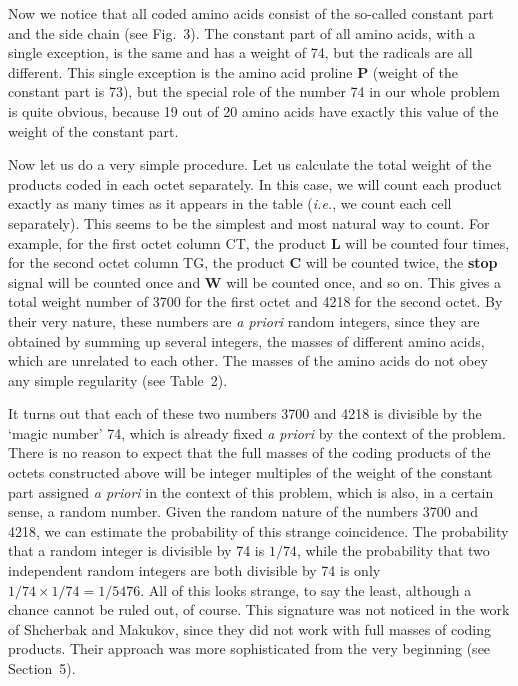 \documentclass[12pt]{article}
\begin{document}
Now we notice that all coded amino acids consist of the so-called constant part and the side chain (see Fig.~3). The constant part of all amino acids, with a single exception, is the same and has a weight of 74, but the radicals are all different. This single exception is the amino acid proline \textbf{P} (weight of the constant part is 73), but the special role of the number 74 in our whole problem is quite obvious, because 19 out of 20 amino acids have exactly this value of the weight of the constant part.

Now let us do a very simple procedure. Let us calculate the total weight of the products coded in each octet separately. In this case, we will count each product exactly as many times as it appears in the table (\textit{i.e.}, we count each cell separately). This seems to be the simplest and most natural way to count. For example, for the first octet column CT, the product \textbf{L} will be counted four times, for the second octet column TG, the product \textbf{C} will be counted twice, the \textbf{stop} signal will be counted once and \textbf{W} will be counted once, and so on. This gives a total weight number of 3700 for the first octet and 4218 for the second octet. By their very nature, these numbers are \textit{a priori} random integers, since they are obtained by summing up several integers, the masses of different amino acids, which are unrelated to each other. The masses of the amino acids do not obey any simple regularity (see Table~2).

It turns out that each of these two numbers 3700 and 4218 is divisible by the `magic number' 74, which is already fixed \textit{a priori} by the context of the problem. There is no reason to expect that the full masses of the coding products of the octets constructed above will be integer multiples of the weight of the constant part assigned \textit{a priori} in the context of this problem, which is also, in a certain sense, a random number. Given the random nature of the numbers 3700 and 4218, we can estimate the probability of this strange coincidence. The probability that a random integer is divisible by 74 is $1/74$, while the probability that two independent random integers are both divisible by 74 is only $1/74 \times 1/74 = 1/5476$. All of this looks strange, to say the least, although a chance cannot be ruled out, of course. This signature was not noticed in the work of Shcherbak and Makukov, since they did not work with full masses of coding products. Their approach was more sophisticated from the very beginning (see Section~5).
\end{document}
